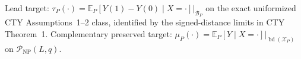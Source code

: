 Lead target: \(\tau_P(\cdot)=\mathbb E_P[Y(1)-Y(0)\mid X=\cdot]\big|_{\mathcal B_P}\) on the exact uniformized CTY Assumptions~1--2 class, identified by the signed-distance limits in CTY Theorem~1.  Complementary preserved target: \(\mu_P(\cdot)=\mathbb E_P[Y\mid X=\cdot]\big|_{\operatorname{bd}(\mathcal X_P)}\) on \(\mathcal P_{\mathrm{NP}}(L,q)\).